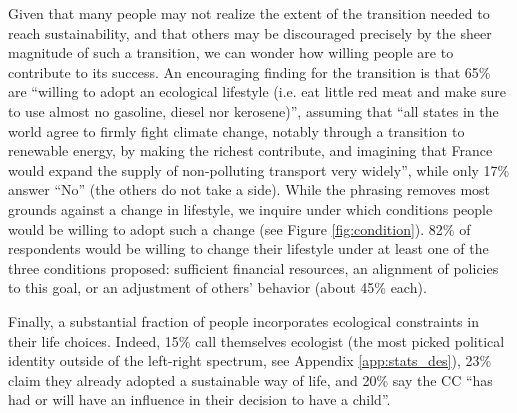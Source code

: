 \documentclass[english,5p,authoryear]{elsarticle}
\begin{document}
Given that many people may not realize the extent of the transition needed to reach sustainability, and that others may be discouraged precisely by the sheer magnitude of such a transition, we can wonder how willing people are to contribute to its success. An encouraging finding for the transition is that 65\% are ``willing to adopt an ecological lifestyle (i.e. eat little red meat and make sure to use almost no gasoline, diesel nor kerosene)'', assuming that ``all states in the world agree to firmly fight climate change, notably through a transition to renewable energy, by making the richest contribute, and imagining that France would expand the supply of non-polluting transport very widely'', while only 17\% answer ``No'' (the others do not take a side). While the phrasing removes most grounds against a change in lifestyle, we inquire under which conditions people would be willing to adopt such a change (see Figure \ref{fig:condition}). 82\% of respondents would be willing to change their lifestyle under at least one of the three conditions proposed: sufficient financial resources, an alignment of policies to this goal, or an adjustment of others' behavior (about 45\% each).


Finally, a substantial fraction of people incorporates ecological constraints in their life choices. Indeed, 15\% call themselves ecologist (the most picked political identity outside of the left-right spectrum, see Appendix \ref{app:stats_des}), 23\% claim they already adopted a sustainable way of life, and 20\% say the CC ``has had or will have an influence in their decision to have a child''. 
\end{document}

